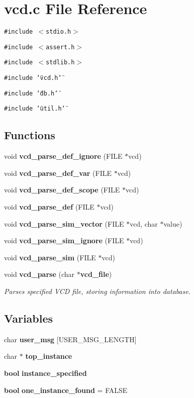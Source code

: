 \section{vcd.c File Reference}
\label{vcd_8c}
{\tt \#include $<$stdio.h$>$}\par
{\tt \#include $<$assert.h$>$}\par
{\tt \#include $<$stdlib.h$>$}\par
{\tt \#include \char`\"{}vcd.h\char`\"{}}\par
{\tt \#include \char`\"{}db.h\char`\"{}}\par
{\tt \#include \char`\"{}util.h\char`\"{}}\par
\subsection*{Functions}
\begin{CompactItemize}
\item 
void {\bf vcd\_\-parse\_\-def\_\-ignore} (FILE $\ast$vcd)
\item 
void {\bf vcd\_\-parse\_\-def\_\-var} (FILE $\ast$vcd)
\item 
void {\bf vcd\_\-parse\_\-def\_\-scope} (FILE $\ast$vcd)
\item 
void {\bf vcd\_\-parse\_\-def} (FILE $\ast$vcd)
\item 
void {\bf vcd\_\-parse\_\-sim\_\-vector} (FILE $\ast$vcd, char $\ast$value)
\item 
void {\bf vcd\_\-parse\_\-sim\_\-ignore} (FILE $\ast$vcd)
\item 
void {\bf vcd\_\-parse\_\-sim} (FILE $\ast$vcd)
\item 
void {\bf vcd\_\-parse} (char $\ast${\bf vcd\_\-file})
\begin{CompactList}\small\item\em Parses specified VCD file, storing information into database.\item\end{CompactList}\end{CompactItemize}
\subsection*{Variables}
\begin{CompactItemize}
\item 
char {\bf user\_\-msg} [USER\_\-MSG\_\-LENGTH]
\item 
char $\ast$ {\bf top\_\-instance}
\item 
{\bf bool} {\bf instance\_\-specified}
\item 
{\bf bool} {\bf one\_\-instance\_\-found} = FALSE
\end{CompactItemize}


